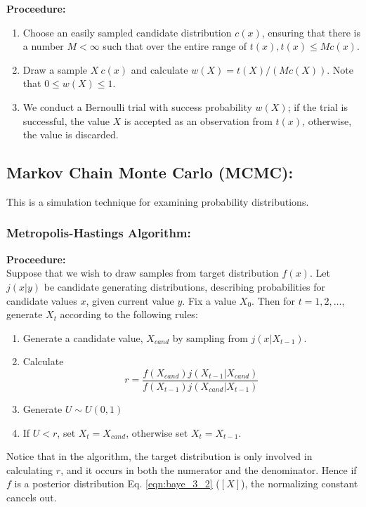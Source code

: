 					\textbf{Proceedure:}
					\begin{enumerate}
						\item[i.] Choose an easily sampled candidate distribution $c(x)$, ensuring that there is a number $M < \infty$ such that over the entire range of $t(x), t(x) \le Mc(x)$.
						\item[ii.] Draw a sample $X ~ c(x)$ and calculate $w(X) = t(X)/(Mc(X))$. Note that $0 \le w(X) \le 1$.
						\item[iii.] We conduct a Bernoulli trial with success probability $w(X)$; if the trial is successful, the value
						$X$ is accepted as an observation from $t(x)$, otherwise, the value is discarded.
					\end{enumerate}

			\subsection{Markov Chain Monte Carlo (MCMC):}
				This is a simulation technique for examining probability distributions.

				\subsubsection{Metropolis-Hastings Algorithm:}
					\textbf{Proceedure:}\\
					Suppose that we wish to draw samples from target distribution $f(x)$.  Let $j(x|y)$ be candidate generating distributions, describing probabilities for candidate values $x$, given current value $y$.
					Fix a value $X_0$. Then for $t=1,2,\dots$, generate $X_t$ according to the following rules:
					\begin{enumerate}
						\item Generate a candidate value, $X_{cand}$ by sampling from $j(x|X_{t-1})$.
						\item Calculate $$r =\frac{f(X_{cand})j(X_{t-1}|X_{cand})}{f(X_{t-1})j(X_{cand}|X_{t-1})} $$
						\item Generate $U \sim U(0,1)$
						\item If $U<r$, set $X_t = X_{cand}$, otherwise set $X_t = X_{t-1}$.
					\end{enumerate}

					Notice that in the algorithm, the target distribution is only involved in calculating $r$, and it occurs in both the numerator and the denominator. Hence if $f$ is a posterior distribution Eq. \eqref{eqn:baye_3_2} ($[X]$), the normalizing constant cancels out.\\

